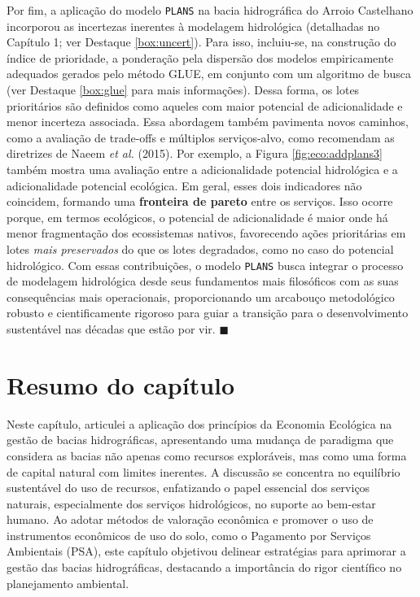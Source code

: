 \documentclass[./main.tex]{subfiles}
\begin{document}
\par Por fim, a aplicação do modelo \texttt{PLANS} na bacia hidrográfica do Arroio Castelhano incorporou as incertezas inerentes à modelagem hidrológica (detalhadas no Capítulo 1; ver Destaque \ref{box:uncert}). Para isso, incluiu-se, na construção do índice de prioridade, a ponderação pela dispersão dos modelos empiricamente adequados gerados pelo método GLUE, em conjunto com um algoritmo de busca (ver Destaque \ref{box:glue} para mais informações). Dessa forma, os lotes prioritários são definidos como aqueles com maior potencial de adicionalidade e menor incerteza associada. Essa abordagem também pavimenta novos caminhos, como a avaliação de trade-offs e múltiplos serviços-alvo, como recomendam as diretrizes de Naeem \textit{et al.} (2015). Por exemplo, a Figura \ref{fig:eco:addplans3} também mostra uma avaliação entre a adicionalidade potencial hidrológica e a adicionalidade potencial ecológica. Em geral, esses dois indicadores não coincidem, formando uma \textbf{fronteira de pareto} entre os serviços. Isso ocorre porque, em termos ecológicos, o potencial de adicionalidade é maior onde há menor fragmentação dos ecossistemas nativos, favorecendo ações prioritárias em lotes \textit{mais preservados} do que os lotes degradados, como no caso do potencial hidrológico. Com essas contribuições, o modelo \texttt{PLANS} busca integrar o processo de modelagem hidrológica desde seus fundamentos mais filosóficos com as suas consequências mais operacionais, proporcionando um arcabouço metodológico robusto e cientificamente rigoroso para guiar a transição para o desenvolvimento sustentável nas décadas que estão por vir. $\blacksquare$

\clearpage

\section{Resumo do capítulo}

\par Neste capítulo, articulei a aplicação dos princípios da Economia Ecológica na gestão de bacias hidrográficas, apresentando uma mudança de paradigma que considera as bacias não apenas como recursos exploráveis, mas como uma forma de capital natural com limites inerentes. A discussão se concentra no equilíbrio sustentável do uso de recursos, enfatizando o papel essencial dos serviços naturais, especialmente dos serviços hidrológicos, no suporte ao bem-estar humano. Ao adotar métodos de valoração econômica e promover o uso de instrumentos econômicos de uso do solo, como o Pagamento por Serviços Ambientais (PSA), este capítulo objetivou delinear estratégias para aprimorar a gestão das bacias hidrográficas, destacando a importância do rigor científico no planejamento ambiental.
\end{document}
